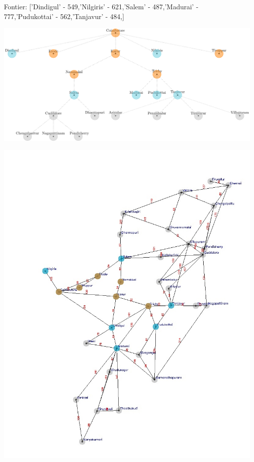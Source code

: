 \documentclass[xcolor=table]{beamer}
\begin{document}
\begin{frame}
  { \tiny Fontier: ['Dindigul' - 549,'Nilgiris' - 621,'Salem' - 487,'Madurai' - 777,'Pudukottai' - 562,'Tanjavur' - 484,]}
  \begin{center}
  \includegraphics[height=0.35\textheight]{../AStarNode/8-1.png}
  \end{center}
  \begin{center}
    \includegraphics[height=0.55\textheight]{../AStaroutput/tamilAStar6.jpg}
  \end{center}
\end{frame}
\end{document}
